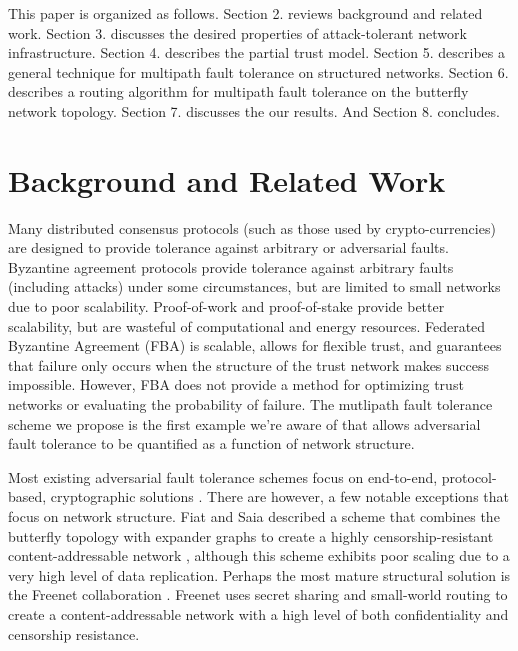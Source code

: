 \documentclass{sig-alternate-05-2015}
\begin{document}
This paper is organized as follows.
Section 2. reviews background and related work.
Section 3. discusses the desired properties of attack-tolerant network
infrastructure.
Section 4. describes the partial trust model.
Section 5. describes a general technique for multipath fault tolerance on
structured networks.
Section 6. describes a routing algorithm for multipath fault tolerance
on the butterfly network topology.
Section 7. discusses the our results.
And Section 8. concludes.

\section{Background and Related Work}

Many distributed consensus protocols (such as those used by crypto-currencies)
are designed to provide tolerance against arbitrary or adversarial faults.
Byzantine agreement protocols
\cite{lamport_byzantine_1982,castro_practical_1999}
provide tolerance against arbitrary faults (including attacks) under
some circumstances, but are limited to small networks due to poor scalability.
Proof-of-work \cite{dwork_pricing_1993,nakamoto_bitcoin:_2008}
and proof-of-stake \cite{king_ppcoin:_2012}
provide better scalability,
but are wasteful of computational and energy resources.
Federated Byzantine Agreement (FBA) \cite{mazieres_stellar_2015}
is scalable, allows for flexible trust,
and guarantees that failure only occurs when the structure of the trust
network makes success impossible.
However, FBA does not provide a method for optimizing trust networks or
evaluating the probability of failure.
The mutlipath fault tolerance scheme we propose is the
first example we're aware of that allows adversarial fault tolerance
to be quantified as a function of network structure.

Most existing adversarial fault tolerance schemes focus on end-to-end,
protocol-based, cryptographic solutions
\cite{ferguson_practical_2003}.
There are however, a few notable exceptions that focus on network structure.
Fiat and Saia described a scheme that combines the butterfly topology
with expander graphs to create a highly censorship-resistant content-addressable
network \cite{fiat_censorship_2002},
although this scheme exhibits poor scaling due to a very high level of data
replication.
Perhaps the most mature structural solution is the Freenet collaboration
\cite{clarke_freenet:_2001}.
Freenet uses secret sharing and small-world routing
\cite{zhang_using_2002,kleinberg_small-world_2000}
to create a content-addressable network with a high level of both
confidentiality and censorship resistance.
\end{document}
